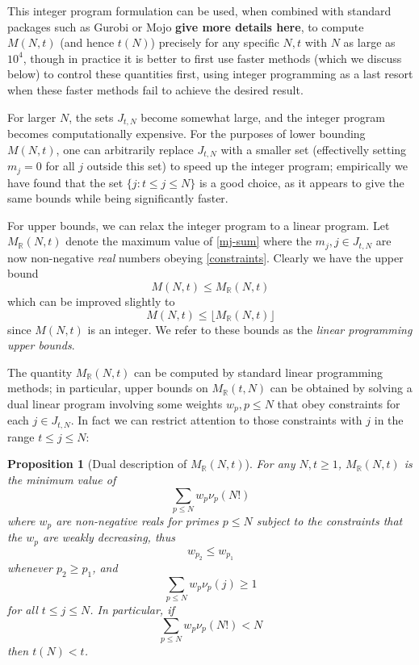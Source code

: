 \documentclass[12pt,a4paper,reqno]{amsart}
\numberwithin{equation}{section}
\theoremstyle{plain}
\newtheorem{proposition}[theorem]{Proposition}
\theoremstyle{definition}
\newcommand\R{\mathbb{R}}
\begin{document}
This integer program formulation can be used, when combined with standard packages such as Gurobi or Mojo {\bf give more details here}, to compute $M(N,t)$ (and hence $t(N)$) precisely for any specific $N,t$ with $N$ as large as $10^4$, though in practice it is better to first use faster methods (which we discuss below) to control these quantities first, using integer programming as a last resort when these faster methods fail to achieve the desired result.

For larger $N$, the sets $J_{t,N}$ become somewhat large, and the integer program becomes computationally expensive.  For the purposes of lower bounding $M(N,t)$, one can arbitrarily replace $J_{t,N}$ with a smaller set (effectivelly setting $m_j=0$ for all $j$ outside this set) to speed up the integer program; empirically we have found that the set $\{ j: t \leq j \leq N \}$ is a good choice, as it appears to give the same bounds while being significantly faster.

For upper bounds, we can relax the integer program to a linear program.  Let $M_\R(N,t)$ denote the maximum value of \eqref{mj-sum} where the $m_j, j \in J_{t,N}$ are now non-negative \emph{real} numbers obeying \eqref{constraints}.  Clearly we have the upper bound
$$ M(N,t) \leq M_\R(N,t)$$
which can be improved slightly to
\begin{equation}\label{lp-upper} 
  M(N,t) \leq \lfloor M_\R(N,t)\rfloor
\end{equation}
since $M(N,t)$ is an integer.  We refer to these bounds as the \emph{linear programming upper bounds}.

The quantity $M_\R(N,t)$ can be computed by standard linear programming methods; in particular, upper bounds on $M_\R(t,N)$ can be obtained by solving a dual linear program involving some weights $w_p, p \leq N$ that obey constraints for each $j \in J_{t,N}$.  In fact we can restrict attention to those constraints with $j$ in the range $t \leq j \leq N$:

\begin{proposition}[Dual description of $M_\R(N,t)$]\label{dual-desc} For any $N,t \geq 1$, $M_\R(N,t)$ is the minimum value of
\begin{equation}\label{hyp}
    \sum_{p \leq N} w_p \nu_p(N!)
\end{equation}
where $w_p$ are non-negative reals for primes $p \leq N$
subject to the constraints that the $w_p$ are weakly decreasing, thus
\begin{equation}\label{wp-decrease}
w_{p_2} \leq w_{p_1}
\end{equation}
whenever $p_2 \geq p_1$, and 
\begin{equation}\label{pj}
  \sum_{p \leq N} w_p \nu_p(j) \geq 1
 \end{equation}
for all $t \leq j \leq N$.  In particular, if
\begin{equation}\label{hyp-low}
  \sum_{p \leq N} w_p \nu_p(N!) < N
\end{equation}
then $t(N) < t$.
\end{proposition}
\end{document}
